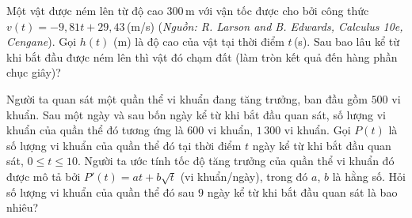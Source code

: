 \begin{bt}%
	Một vật được ném lên từ độ cao $300$\,m với vận tốc được cho bởi công thức \linebreak $v(t)=-9{,}81t+29{,}43$\,(m/s) (\textit{Nguồn: R. Larson  and B. Edwards, Calculus 10e, Cengane}). Gọi $h(t)$ (m) là độ cao của vật tại thời điểm $t$\,(s). Sau bao lâu kể từ khi bắt đầu được ném lên thì vật đó chạm đất (làm tròn kết quả đến hàng phần chục giây)?
\end{bt}

\begin{bt}%
	Người ta quan sát một quần thể vi khuẩn đang tăng trưởng, ban đầu gồm $500$ vi khuẩn. Sau một ngày và sau bốn ngày kể từ khi bắt đầu quan sát, số lượng vi khuẩn của quần thể đó tương ứng là $600$ vi khuẩn, $1\,300$ vi khuẩn. Gọi $P(t)$ là số lượng vi khuẩn của quần thể đó tại thời điểm $t$ ngày kể từ khi bắt đầu quan sát, $0 \le t \le 10$. Người ta ước tính tốc độ tăng trưởng của quần thể vi khuẩn đó được mô  tả bởi $P'(t) = at + b\sqrt{t}$ (vi khuẩn/ngày), trong đó $a$, $b$ là hằng số. Hỏi số lượng vi khuẩn của quần thể đó sau $9$ ngày kể từ khi bắt đầu quan sát là bao nhiêu?
\end{bt}

